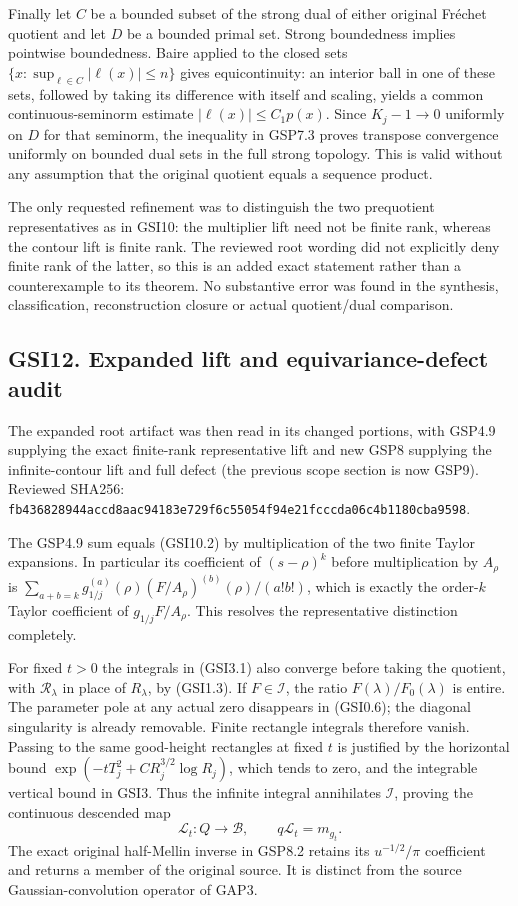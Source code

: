 Finally let \(C\) be a bounded subset of the strong dual of either
original Fréchet quotient and let \(D\) be a bounded primal set. Strong
boundedness implies pointwise boundedness. Baire applied to the closed
sets \(\{x:\sup_{\ell\in C}|\ell(x)|\le n\}\) gives equicontinuity: an
interior ball in one of these sets, followed by taking its difference
with itself and scaling, yields a common continuous-seminorm estimate
\(|\ell(x)|\le C_1p(x)\). Since \(K_j-1\to0\) uniformly on \(D\) for
that seminorm, the inequality in GSP7.3 proves transpose convergence
uniformly on bounded dual sets in the full strong topology. This is
valid without any assumption that the original quotient equals a
sequence product.

The only requested refinement was to distinguish the two prequotient
representatives as in GSI10: the multiplier lift need not be finite
rank, whereas the contour lift is finite rank. The reviewed root wording
did not explicitly deny finite rank of the latter, so this is an added
exact statement rather than a counterexample to its theorem. No
substantive error was found in the synthesis, classification,
reconstruction closure or actual quotient/dual comparison.

\subsection{GSI12. Expanded lift and equivariance-defect
audit}\label{gsi12.-expanded-lift-and-equivariance-defect-audit}

The expanded root artifact was then read in its changed portions, with
GSP4.9 supplying the exact finite-rank representative lift and new GSP8
supplying the infinite-contour lift and full defect (the previous scope
section is now GSP9). Reviewed SHA256:
\nolinkurl{fb436828944accd8aac94183e729f6c55054f94e21fcccda06c4b1180cba9598}.

The GSP4.9 sum equals (GSI10.2) by multiplication of the two finite
Taylor expansions. In particular its coefficient of \((s-\rho)^k\)
before multiplication by \(A_\rho\) is
\(\sum_{a+b=k}g_{1/j}^{(a)}(\rho)(F/A_\rho)^{(b)}(\rho)/(a!b!)\), which
is exactly the order-\(k\) Taylor coefficient of \(g_{1/j}F/A_\rho\).
This resolves the representative distinction completely.

For fixed \(t>0\) the integrals in (GSI3.1) also converge before taking
the quotient, with \(\mathscr R_\lambda\) in place of \(R_\lambda\), by
(GSI1.3). If \(F\in\mathcal I\), the ratio \(F(\lambda)/F_0(\lambda)\)
is entire. The parameter pole at any actual zero disappears in (GSI0.6);
the diagonal singularity is already removable. Finite rectangle
integrals therefore vanish. Passing to the same good-height rectangles
at fixed \(t\) is justified by the horizontal bound
\(\exp(-tT_j^2+C R_j^{3/2}\log R_j)\), which tends to zero, and the
integrable vertical bound in GSI3. Thus the infinite integral
annihilates \(\mathcal I\), proving the continuous descended map \[
\mathcal L_t:Q\longrightarrow\mathcal B,
\qquad q\mathcal L_t=m_{g_t}.
\tag{GSI12.1}
\] The exact original half-Mellin inverse in GSP8.2 retains its
\(u^{-1/2}/\pi\) coefficient and returns a member of the original
source. It is distinct from the source Gaussian-convolution operator of
GAP3.

